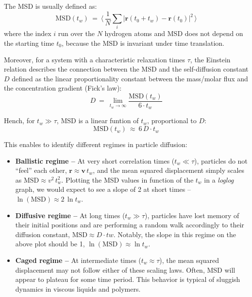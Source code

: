 The MSD is usually defined as:
\begin{equation}\label{eq:MSD}
\text{MSD}(t_w) \: = \: \langle \, \frac{1}{N} \sum_{i}  \left| \textbf{r}(t_0 + t_w) - \textbf{r}(t_0) \right|^2 \, \rangle
\end{equation}
where the index $i$ run over the $N$ hydrogen atoms and MSD does not depend on the starting time $t_0$, because the MSD is invariant under time translation. 

Moreover, for a system with a characteristic relaxation times $\tau$, the Einstein relation describes the connection between the MSD and the self-diffusion constant $D$ defined as the linear proportionality constant between the mass/molar flux and the concentration gradient (Fick's law):
\begin{equation}
D \: = \: \lim_{t_w \rightarrow \infty} \frac{\text{MSD}(t_w)}{6 \cdot t_w} 
\end{equation}

Hench, for $t_w \gg \tau$, MSD is a linear funtion of $t_w$, proportional to $D$:
\begin{equation}
\text{MSD}(t_w) \: \approx \: 6 \, D \cdot t_w
\end{equation}

This enables to identify different regimes in particle diffusion:
\begin{itemize}
\item \textbf{Ballistic regime --}  At very short correlation times ($t_w \ll \tau$), particles do not ``feel'' each other, $\textbf{r} \approx \textbf{v} \, t_w$, and the mean squared displacement simply scales as $\text{MSD} \approx v^2 \, t_w^2$.  Plotting the MSD values in function of the $t_w$ in a \textit{loglog} graph, we would expect to see a slope of 2 at short times -- $\ln(\text{MSD}) \approx 2\, \ln t_w$. 
\item \textbf{Diffusive  regime --} At long times ($t_w \gg \tau$), particles have lost memory of their initial positions and are performing a random walk accordingly to their diffusion constant, $\text{MSD} \approx D \cdot tw$. Notably, the slope in this regime on the above plot should be 1, $\ln(\text{MSD}) \approx \ln t_w$.
\item \textbf{Caged regime --} At intermediate times ($t_w \approx \tau$), the mean squared displacement may not follow either of these scaling laws.  Often, MSD will appear to plateau for some time period.  This behavior is typical of sluggish dynamics in viscous liquids and polymers. 
\end{itemize}


